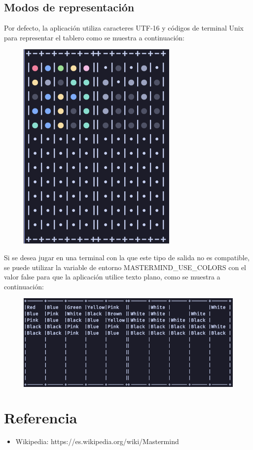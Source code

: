 \documentclass[a4paper,titlepage]{article}
\begin{document}
\subsection{Modos de representación}

Por defecto, la aplicación utiliza caracteres UTF-16 y códigos de terminal
Unix para representar el tablero como se muestra a continuación:

\begin{figure}[H]
    \centering
    \includegraphics[scale=0.5]{imgs/MastermindColor.png}
\end{figure}

Si se desea jugar en una terminal con la que este tipo de salida no es
compatible, se puede utilizar la variable de entorno
MASTERMIND{\_}USE{\_}COLORS con el valor false para que la aplicación
utilice texto plano, como se muestra a continuación:

\begin{figure}[H]
    \centering
    \includegraphics[scale=0.5]{imgs/MastermindWords.png}
\end{figure}

\section{Referencia}
\begin{itemize}
    \item Wikipedia: https://es.wikipedia.org/wiki/Mastermind
\end{itemize}
\end{document}
